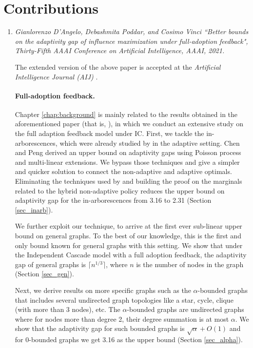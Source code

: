 \section{Contributions} \label{sec:cont}

\begin{enumerate}


    \item  \textit{Gianlorenzo D’Angelo, Debashmita Poddar, and Cosimo Vinci ``Better bounds on the adaptivity gap of influence maximization under full-adoption feedback", Thirty-Fifth AAAI Conference on Artificial Intelligence, AAAI, 2021.}

    The extended version of the above paper is accepted at the \textit{Artificial Intelligence Journal (AIJ)} \cite{AIJ}.

\paragraph{Full-adoption feedback.}


 

Chapter \ref{chap:background} is mainly related to the results obtained in the aforementioned paper (that is, \cite{DAngelo}), in which we conduct an extensive study on the full adaption feedback model under IC. 
First, we tackle the in-arborescences, which were already studied by \cite{Chen2019} in the adaptive setting. Chen and Peng \cite{Chen2019} derived an upper bound on adaptivity gaps using Poisson process and multi-linear extensions. We bypass those techniques and give a simpler and quicker solution to connect the non-adaptive and adaptive optimals. Eliminating the techniques used by \cite{Chen2019} and building the proof on the marginals related to the hybrid non-adaptive policy reduces the upper bound on adaptivity gap for the in-arborescences from 3.16 to 2.31 (Section \ref{sec_inarb}).

We further exploit our technique, to arrive at the first ever sub-linear upper bound on general graphs. To the best of our knowledge, this is the first and only bound known for general graphs with this setting. We show that under the Independent Cascade model with a full adoption feedback, the adaptivity gap of general graphs is $\lceil n^{1/3}\rceil$, where $n$ is the number of nodes in the graph (Section \ref{sec_gen}).

Next, we derive results on more specific graphs such as the $\alpha$-bounded graphs that includes several undirected graph topologies like a star, cycle, clique (with more than 3 nodes), etc. The $\alpha$-bounded graphs are undirected graphs where for nodes more than degree 2, their degree summation is at most $\alpha$. We show that the adaptivity gap for such bounded graphs is $\sqrt{\alpha}+O(1)$ and for 0-bounded graphs we get 3.16 as the upper bound (Section \ref{sec_alpha}).


\end{enumerate}
